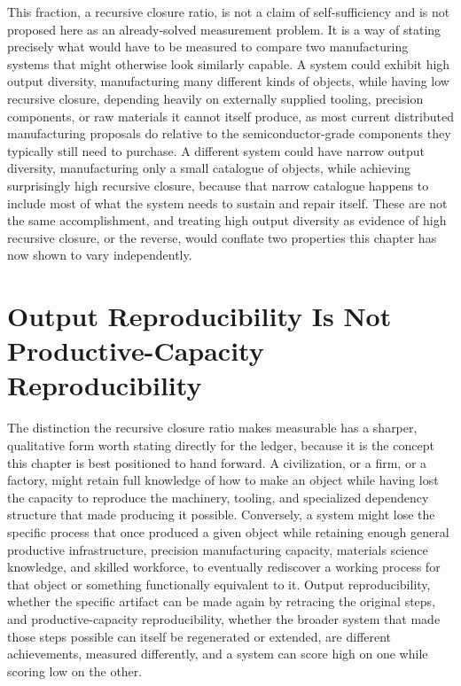 \documentclass[11pt]{book}
\begin{document}
This fraction, a recursive closure ratio, is not a claim of self-sufficiency and is not proposed here as an already-solved measurement problem. It is a way of stating precisely what would have to be measured to compare two manufacturing systems that might otherwise look similarly capable. A system could exhibit high output diversity, manufacturing many different kinds of objects, while having low recursive closure, depending heavily on externally supplied tooling, precision components, or raw materials it cannot itself produce, as most current distributed manufacturing proposals do relative to the semiconductor-grade components they typically still need to purchase. A different system could have narrow output diversity, manufacturing only a small catalogue of objects, while achieving surprisingly high recursive closure, because that narrow catalogue happens to include most of what the system needs to sustain and repair itself. These are not the same accomplishment, and treating high output diversity as evidence of high recursive closure, or the reverse, would conflate two properties this chapter has now shown to vary independently.

\section{Output Reproducibility Is Not Productive-Capacity Reproducibility}

The distinction the recursive closure ratio makes measurable has a sharper, qualitative form worth stating directly for the ledger, because it is the concept this chapter is best positioned to hand forward. A civilization, or a firm, or a factory, might retain full knowledge of how to make an object while having lost the capacity to reproduce the machinery, tooling, and specialized dependency structure that made producing it possible. Conversely, a system might lose the specific process that once produced a given object while retaining enough general productive infrastructure, precision manufacturing capacity, materials science knowledge, and skilled workforce, to eventually rediscover a working process for that object or something functionally equivalent to it. Output reproducibility, whether the specific artifact can be made again by retracing the original steps, and productive-capacity reproducibility, whether the broader system that made those steps possible can itself be regenerated or extended, are different achievements, measured differently, and a system can score high on one while scoring low on the other.
\end{document}

